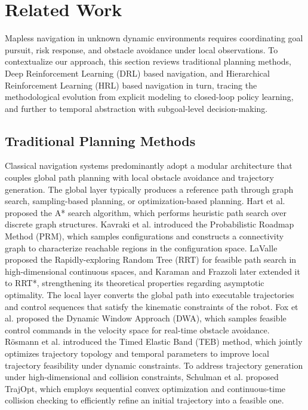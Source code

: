 
\section{Related Work}
\label{sec:related_work}

Mapless navigation in unknown dynamic environments requires coordinating goal pursuit, risk response, and obstacle avoidance under local observations. To contextualize our approach, this section reviews traditional planning methods, Deep Reinforcement Learning (DRL) based navigation, and Hierarchical Reinforcement Learning (HRL) based navigation in turn, tracing the methodological evolution from explicit modeling to closed-loop policy learning, and further to temporal abstraction with subgoal-level decision-making.

\subsection{Traditional Planning Methods}
\label{subsec:traditional_planning}

Classical navigation systems predominantly adopt a modular architecture that couples global path planning with local obstacle avoidance and trajectory generation. The global layer typically produces a reference path through graph search, sampling-based planning, or optimization-based planning. Hart et al. \cite{17} proposed the A* search algorithm, which performs heuristic path search over discrete graph structures. Kavraki et al. \cite{18} introduced the Probabilistic Roadmap Method (PRM), which samples configurations and constructs a connectivity graph to characterize reachable regions in the configuration space. LaValle \cite{19} proposed the Rapidly-exploring Random Tree (RRT) for feasible path search in high-dimensional continuous spaces, and Karaman and Frazzoli \cite{20} later extended it to RRT*, strengthening its theoretical properties regarding asymptotic optimality. The local layer converts the global path into executable trajectories and control sequences that satisfy the kinematic constraints of the robot. Fox et al. \cite{2} proposed the Dynamic Window Approach (DWA), which samples feasible control commands in the velocity space for real-time obstacle avoidance. R\"{o}smann et al. \cite{21} introduced the Timed Elastic Band (TEB) method, which jointly optimizes trajectory topology and temporal parameters to improve local trajectory feasibility under dynamic constraints. To address trajectory generation under high-dimensional and collision constraints, Schulman et al. \cite{22} proposed TrajOpt, which employs sequential convex optimization and continuous-time collision checking to efficiently refine an initial trajectory into a feasible one.

